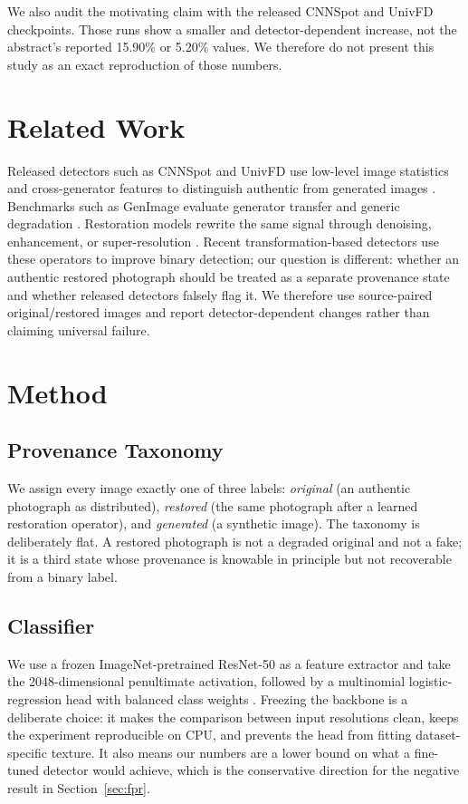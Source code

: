﻿\documentclass[graybox,norunningheads]{svmult}
\begin{document}
We also audit the motivating claim with the released CNNSpot and UnivFD checkpoints.
Those runs show a smaller and detector-dependent increase, not the abstract's
reported 15.90\% or 5.20\% values. We therefore do not present this study as an
exact reproduction of those numbers.

\section{Related Work}

Released detectors such as CNNSpot and UnivFD use low-level image statistics and
cross-generator features to distinguish authentic from generated images
\cite{wang2020cnnspot,ojha2023univfd}. Benchmarks such as GenImage evaluate
generator transfer and generic degradation \cite{zhu2023genimage}. Restoration
models rewrite the same signal through denoising, enhancement, or
super-resolution \cite{wang2021realesrgan,zamir2022restormer}. Recent
transformation-based detectors use these operators to improve binary detection;
our question is different: whether an authentic restored photograph should be
treated as a separate provenance state and whether released detectors falsely
flag it. We therefore use source-paired original/restored images and report
detector-dependent changes rather than claiming universal failure.

\section{Method}

\subsection{Provenance Taxonomy}

We assign every image exactly one of three labels:
\emph{original} (an authentic photograph as distributed),
\emph{restored} (the same photograph after a learned restoration operator),
and \emph{generated} (a synthetic image). The taxonomy is deliberately flat. A
restored photograph is not a degraded original and not a fake; it is a third state
whose provenance is knowable in principle but not recoverable from a binary label.

\subsection{Classifier}

We use a frozen ImageNet-pretrained ResNet-50 \cite{he2016resnet} as a feature
extractor and take the 2048-dimensional penultimate activation, followed by a
multinomial logistic-regression head with balanced class weights
\cite{pedregosa2011sklearn}. Freezing the backbone is a deliberate choice: it makes
the comparison between input resolutions clean, keeps the experiment reproducible on
CPU, and prevents the head from fitting dataset-specific texture. It also means our
numbers are a lower bound on what a fine-tuned detector would achieve, which is the
conservative direction for the negative result in Section~\ref{sec:fpr}.
\end{document}
